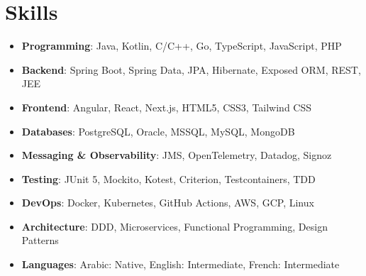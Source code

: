 \documentclass[letterpaper,11pt]{article}
\newcommand{\resumeSubHeadingListStart}{\begin{itemize}[leftmargin=*]}
\newcommand{\resumeSubHeadingListEnd}{\end{itemize}}
\begin{document}
\section{Skills}
\resumeSubHeadingListStart
  \item{
    \textbf{Programming}{: Java, Kotlin, C/C++, Go, TypeScript, JavaScript, PHP}
  }
  \item{
    \textbf{Backend}{: Spring Boot, Spring Data, JPA, Hibernate, Exposed ORM, REST, JEE}
  }
  \item{
    \textbf{Frontend}{: Angular, React, Next.js, HTML5, CSS3, Tailwind CSS}
  }
  \item{
    \textbf{Databases}{: PostgreSQL, Oracle, MSSQL, MySQL, MongoDB}
  }
  \item{
    \textbf{Messaging \& Observability}{: JMS, OpenTelemetry, Datadog, Signoz}
  }
  \item{
    \textbf{Testing}{: JUnit 5, Mockito, Kotest, Criterion, Testcontainers, TDD}
  }
  \item{
    \textbf{DevOps}{: Docker, Kubernetes, GitHub Actions, AWS, GCP, Linux}
  }
  \item{
    \textbf{Architecture}{: DDD, Microservices, Functional Programming, Design Patterns}
  }
  \item{
    \textbf{Languages}{: Arabic: Native, English: Intermediate, French: Intermediate}
  }
\resumeSubHeadingListEnd

\end{document}
